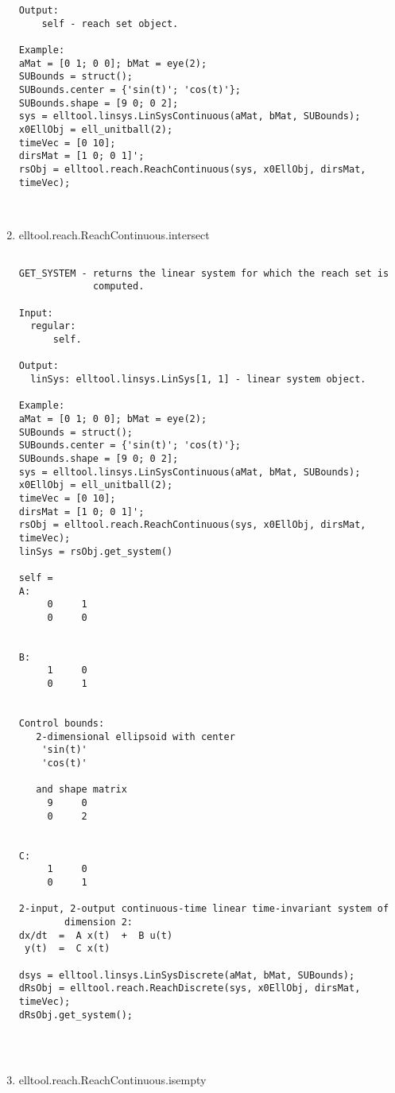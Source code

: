 \begin{enumerate}
\begin{lstlisting}
Output:
    self - reach set object.

Example:
aMat = [0 1; 0 0]; bMat = eye(2);
SUBounds = struct();
SUBounds.center = {'sin(t)'; 'cos(t)'};
SUBounds.shape = [9 0; 0 2];
sys = elltool.linsys.LinSysContinuous(aMat, bMat, SUBounds);
x0EllObj = ell_unitball(2);
timeVec = [0 10];
dirsMat = [1 0; 0 1]';
rsObj = elltool.reach.ReachContinuous(sys, x0EllObj, dirsMat, timeVec);



\end{lstlisting}
\fontfamily{\familydefault}
\selectfont
\item {elltool.reach.ReachContinuous.intersect}
\selectfont
\begin{lstlisting}

GET_SYSTEM - returns the linear system for which the reach set is
             computed.

Input:
  regular:
      self.

Output:
  linSys: elltool.linsys.LinSys[1, 1] - linear system object.

Example:
aMat = [0 1; 0 0]; bMat = eye(2);
SUBounds = struct();
SUBounds.center = {'sin(t)'; 'cos(t)'};
SUBounds.shape = [9 0; 0 2];
sys = elltool.linsys.LinSysContinuous(aMat, bMat, SUBounds);
x0EllObj = ell_unitball(2);
timeVec = [0 10];
dirsMat = [1 0; 0 1]';
rsObj = elltool.reach.ReachContinuous(sys, x0EllObj, dirsMat, timeVec);
linSys = rsObj.get_system()

self =
A:
     0     1
     0     0


B:
     1     0
     0     1


Control bounds:
   2-dimensional ellipsoid with center
    'sin(t)'
    'cos(t)'

   and shape matrix
     9     0
     0     2


C:
     1     0
     0     1

2-input, 2-output continuous-time linear time-invariant system of
        dimension 2:
dx/dt  =  A x(t)  +  B u(t)
 y(t)  =  C x(t)

dsys = elltool.linsys.LinSysDiscrete(aMat, bMat, SUBounds);
dRsObj = elltool.reach.ReachDiscrete(sys, x0EllObj, dirsMat, timeVec);
dRsObj.get_system();




\end{lstlisting}
\fontfamily{\familydefault}
\selectfont
\item {elltool.reach.ReachContinuous.isempty}
\selectfont
\begin{lstlisting}


\end{lstlisting}
\end{enumerate}
